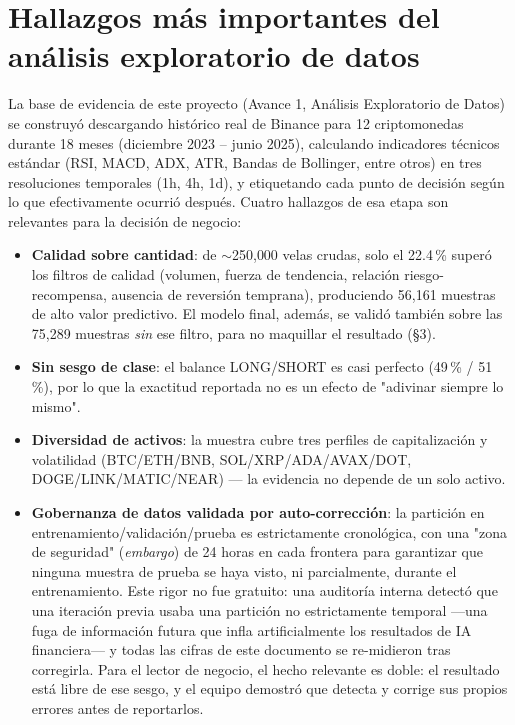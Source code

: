 \documentclass[11pt]{article}
\begin{document}
\section{Hallazgos m\'as importantes del an\'alisis exploratorio de datos}

La base de evidencia de este proyecto (Avance 1, An\'alisis Exploratorio de Datos) se construy\'o descargando hist\'orico real de Binance para 12 criptomonedas durante 18 meses (diciembre 2023 -- junio 2025), calculando indicadores t\'ecnicos est\'andar (RSI, MACD, ADX, ATR, Bandas de Bollinger, entre otros) en tres resoluciones temporales (1h, 4h, 1d), y etiquetando cada punto de decisi\'on seg\'un lo que efectivamente ocurri\'o despu\'es. Cuatro hallazgos de esa etapa son relevantes para la decisi\'on de negocio:

\begin{itemize}
\item \textbf{Calidad sobre cantidad}: de $\sim$250{,}000 velas crudas, solo el 22.4\,\% super\'o los filtros de calidad (volumen, fuerza de tendencia, relaci\'on riesgo-recompensa, ausencia de reversi\'on temprana), produciendo 56{,}161 muestras de alto valor predictivo. El modelo final, adem\'as, se valid\'o tambi\'en sobre las 75{,}289 muestras \emph{sin} ese filtro, para no maquillar el resultado (\S3).
\item \textbf{Sin sesgo de clase}: el balance LONG/SHORT es casi perfecto (49\,\% / 51\,\%), por lo que la exactitud reportada no es un efecto de "adivinar siempre lo mismo".
\item \textbf{Diversidad de activos}: la muestra cubre tres perfiles de capitalizaci\'on y volatilidad (BTC/ETH/BNB, SOL/XRP/ADA/AVAX/DOT, DOGE/LINK/MATIC/NEAR) --- la evidencia no depende de un solo activo.
\item \textbf{Gobernanza de datos validada por auto-correcci\'on}: la partici\'on en entrenamiento/validaci\'on/prueba es estrictamente cronol\'ogica, con una "zona de seguridad" (\textit{embargo}) de 24 horas en cada frontera para garantizar que ninguna muestra de prueba se haya visto, ni parcialmente, durante el entrenamiento. Este rigor no fue gratuito: una auditor\'ia interna detect\'o que una iteraci\'on previa usaba una partici\'on no estrictamente temporal ---una fuga de informaci\'on futura que infla artificialmente los resultados de IA financiera--- y todas las cifras de este documento se re-midieron tras corregirla. Para el lector de negocio, el hecho relevante es doble: el resultado est\'a libre de ese sesgo, y el equipo demostr\'o que detecta y corrige sus propios errores antes de reportarlos.
\end{itemize}
\end{document}
